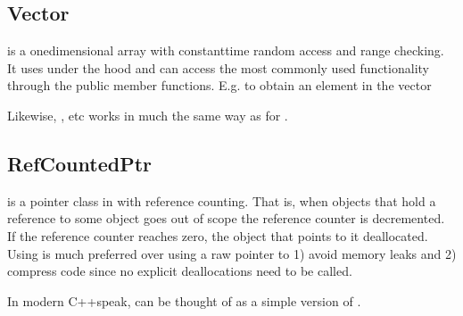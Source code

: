\documentclass[letterpaper,10pt,english]{sphinxmanual}
\begin{document}
\subsection{Vector}
\label{\detokenize{Source/ChomboBasics:vector}}
 is a one\sphinxhyphen{}dimensional array with constant\sphinxhyphen{}time random access and range checking.
It uses  under the hood and can access the most commonly used  functionality through the public member functions.
E.g. to obtain an element in the vector

\begin{sphinxVerbatim}[commandchars=\\\{\},formatcom=\scriptsize]
  

   \PYG{p}{[}\PYG{p}{]}
\end{sphinxVerbatim}

Likewise, ,  etc works in much the same way as for .


\subsection{RefCountedPtr}
\label{\detokenize{Source/ChomboBasics:refcountedptr}}
 is a pointer class in  with reference counting.
That is, when objects that hold a reference to some  object goes out of scope the reference counter is decremented.
If the reference counter reaches zero, the object that  points to it deallocated.
Using  is much preferred over using a raw pointer  to 1) avoid memory leaks and 2) compress code since no explicit deallocations need to be called.

In modern C++\sphinxhyphen{}speak,  can be thought of as a  simple version of .
\end{document}
